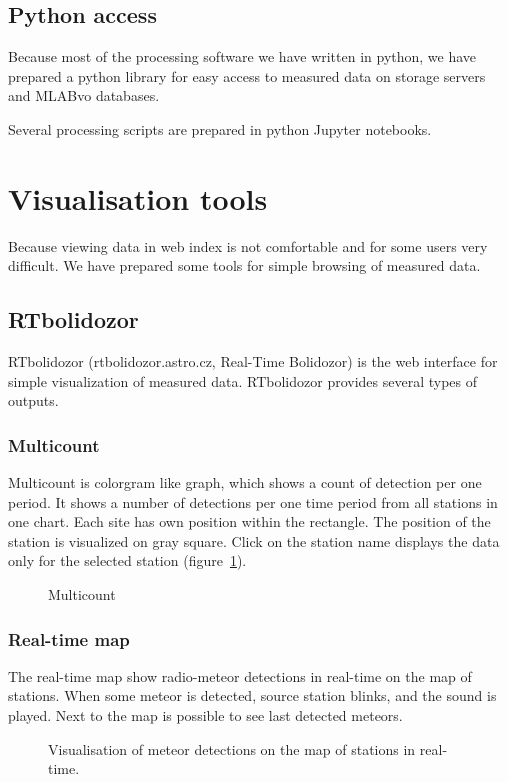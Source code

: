 \documentclass[10pt,a4paper,twoside,dvips]{article}
\begin{document}
\begin{IMCpaper}
\subsection{Python access}
Because most of the processing software we have written in python, we have prepared a python library for easy access to measured data on storage servers and MLABvo databases.                                       

Several processing scripts are prepared in python Jupyter notebooks.             

\section{Visualisation tools}
Because viewing data in web index is not comfortable and for some users very difficult. We have prepared some tools for simple browsing of measured data. 

\subsection{RTbolidozor}
RTbolidozor (rtbolidozor.astro.cz, Real-Time Bolidozor) is the web interface for simple visualization of measured data. RTbolidozor provides several types of outputs.
                                                
\subsubsection{Multicount}
Multicount is colorgram like graph, which shows a count of detection per one period. It shows a number of detections per one time period from all stations in one chart. Each site has own position within the rectangle. The position of the station is visualized on gray square. Click on the station name displays the data only for the selected station (figure~\ref{RTBm}).

\begin{figure}[htb]
\centering
{}
\caption{Multicount}%
\label{RTBm}
\end{figure}

\subsubsection{Real-time map}
The real-time map show radio-meteor detections in real-time on the map of stations. When some meteor is detected, source station blinks, and the sound is played. Next to the map is possible to see last detected meteors.
\begin{figure}[!htb]
\centering
{}
\caption{Visualisation of meteor detections on the map of stations in real-time.}%
\label{RTBmmap}
\end{figure}


\end{IMCpaper}
\end{document}
